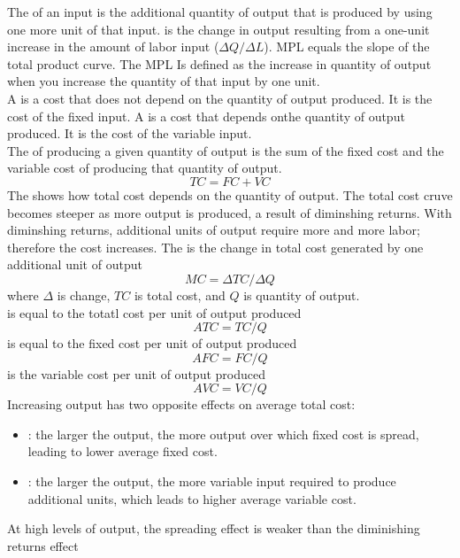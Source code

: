 \documentclass{article}
\begin{document}
The  of an input is the additional quantity of output that is produced by using one more unit of that input.  is the change in output resulting from a one-unit increase in the amount of labor input ($\Delta Q / \Delta L$). MPL equals the slope of the total product curve. The MPL Is defined as the increase in quantity of output when you increase the quantity of that input by one unit. \\ 

A  is a cost that does not depend on the quantity of output produced. It is the cost of the fixed input. A  is a cost that depends onthe quantity of output produced. It is the cost of the variable input. \\ 

The  of producing a given quantity of output is the sum of the fixed cost and the variable cost of producing that quantity of output. $$TC = FC + VC$$ The  shows how total cost depends on the quantity of output. The total cost cruve becomes steeper as more output is produced, a result of diminshing returns. With diminshing returns, additional units of output require more and more labor; therefore the cost increases. The  is the change in total cost generated by one additional unit of output $$MC = \Delta TC / \Delta Q$$ where $\Delta$ is change, $TC$ is total cost, and $Q$ is quantity of output. \\ 

 is equal to the totatl cost per unit of output produced $$ATC = TC / Q$$  is equal to the fixed cost per unit of output produced $$AFC = FC / Q$$  is the variable cost per unit of output produced $$AVC = VC / Q$$ Increasing output has two opposite effects on average total cost: 
\begin{itemize}
  \item {}: the larger the output, the more output over which fixed cost is spread, leading to lower average fixed cost. 
  \item {}: the larger the output, the more variable input required to produce additional units, which leads to higher average variable cost. 
\end{itemize}

\begin{remark}
  At high levels of output, the spreading effect is weaker than the diminishing returns effect
\end{remark}
\end{document}
